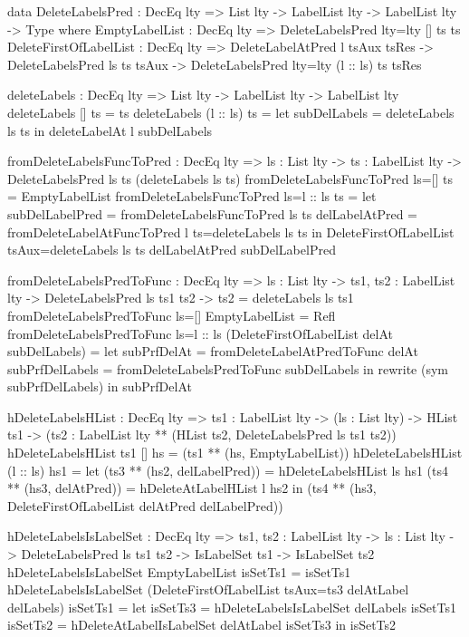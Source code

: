 \begin{code}
data DeleteLabelsPred : DecEq lty => List lty -> LabelList lty -> 
  LabelList lty -> Type where
  EmptyLabelList : DecEq lty => DeleteLabelsPred {lty=lty} [] ts ts
  DeleteFirstOfLabelList : DecEq lty => 
    DeleteLabelAtPred l tsAux tsRes -> 
    DeleteLabelsPred ls ts tsAux ->
    DeleteLabelsPred {lty=lty} (l :: ls) ts tsRes
    
deleteLabels : DecEq lty => List lty -> LabelList lty -> 
  LabelList lty
deleteLabels [] ts = ts
deleteLabels (l :: ls) ts = 
  let subDelLabels = deleteLabels ls ts
  in deleteLabelAt l subDelLabels

fromDeleteLabelsFuncToPred : DecEq lty => {ls : List lty} -> 
  {ts : LabelList lty} -> 
  DeleteLabelsPred ls ts (deleteLabels ls ts)    
fromDeleteLabelsFuncToPred {ls=[]} {ts} = EmptyLabelList
fromDeleteLabelsFuncToPred {ls=l :: ls} {ts} = 
  let subDelLabelPred = fromDeleteLabelsFuncToPred {ls} {ts}
      delLabelAtPred = fromDeleteLabelAtFuncToPred {l} 
        {ts=deleteLabels ls ts}
  in DeleteFirstOfLabelList {tsAux=deleteLabels ls ts}  
       delLabelAtPred subDelLabelPred
    
fromDeleteLabelsPredToFunc : DecEq lty => {ls : List lty} -> 
  {ts1, ts2 : LabelList lty} -> DeleteLabelsPred ls ts1 ts2 ->
  ts2 = deleteLabels ls ts1
fromDeleteLabelsPredToFunc {ls=[]} EmptyLabelList = Refl
fromDeleteLabelsPredToFunc {ls=l :: ls} 
  (DeleteFirstOfLabelList delAt subDelLabels) = 
  let subPrfDelAt = fromDeleteLabelAtPredToFunc delAt
      subPrfDelLabels = fromDeleteLabelsPredToFunc subDelLabels
  in rewrite (sym subPrfDelLabels) in subPrfDelAt    
    
hDeleteLabelsHList : DecEq lty => {ts1 : LabelList lty} -> 
  (ls : List lty) -> HList ts1 ->
  (ts2 : LabelList lty ** (HList ts2, DeleteLabelsPred ls ts1 ts2))
hDeleteLabelsHList {ts1} [] hs = (ts1 ** (hs, EmptyLabelList))
hDeleteLabelsHList (l :: ls) hs1 = 
  let (ts3 ** (hs2, delLabelPred)) = hDeleteLabelsHList ls hs1
      (ts4 ** (hs3, delAtPred)) = hDeleteAtLabelHList l hs2
  in (ts4 ** (hs3, DeleteFirstOfLabelList delAtPred delLabelPred))

hDeleteLabelsIsLabelSet : DecEq lty => 
  {ts1, ts2 : LabelList lty} -> {ls : List lty} -> 
  DeleteLabelsPred ls ts1 ts2 ->
  IsLabelSet ts1 -> IsLabelSet ts2
hDeleteLabelsIsLabelSet EmptyLabelList isSetTs1 = isSetTs1
hDeleteLabelsIsLabelSet (DeleteFirstOfLabelList {tsAux=ts3} 
  delAtLabel delLabels) isSetTs1 = 
  let isSetTs3 = hDeleteLabelsIsLabelSet delLabels isSetTs1
      isSetTs2 = hDeleteAtLabelIsLabelSet delAtLabel isSetTs3
  in isSetTs2
  

\end{code}

